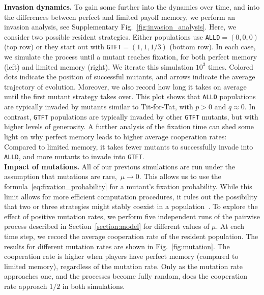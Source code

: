 \documentclass[11pt]{article}
\def\alld{\texttt{ALLD}}
\def\gtft{\texttt{GTFT}}
\theoremstyle{plainCl1}
\theoremstyle{plainCl2}
\begin{document}
\noindent
{\bf Invasion dynamics.} To gain some further into the dynamics over time, and into the differences between perfect and limited payoff memory, we perform an invasion analysis, see Supplementary Fig.~\ref{fig:invasion_analysis}. 
Here, we consider two possible resident strategies. 
Either populations use \alld$=(0,0,0)$ (top row) or they start out with \gtft$=(1,1,1/3)$ (bottom row). 
In each case, we simulate the process until a mutant reaches fixation, for both perfect memory (left) and limited memory (right). 
We iterate this simulation $10^{3}$ times. 
Colored dots indicate the position of successful mutants, and arrows indicate the average trajectory of evolution. 
Moreover, we also record how long it takes on average until the first mutant strategy takes over. 
This plot shows that \alld{} populations are typically invaded by mutants similar to Tit-for-Tat, with $p\!>\!0$ and $q\!\approx\!0$. 
In contrast, \gtft{} populations are typically invaded by other \gtft{} mutants, but with higher levels of generosity. 
A further analysis of the fixation time can shed some light on why perfect memory leads to higher average cooperation rates: 
Compared to limited memory, it takes fewer mutants to successfully invade into \alld{}, and more mutants to invade into \gtft{}.\\



\noindent
{\bf Impact of mutations.} 
All of our previous simulations are run under the assumption that mutations are rare,~$\mu\!\rightarrow\!0$. 
This allows us to use the formula~\eqref{eq:fixation_probability} for a mutant's fixation probability. 
While this limit allows for more efficient computation procedures, it rules out the possibility that two or three strategies might stably coexist in a population~\cite{tkadlec:pnas:2023}.
To explore the effect of positive mutation rates, we perform five independent runs of the pairwise process described in
Section~\ref{section:model} for different values of $\mu$.
At each time step, we record the average cooperation rate of the resident population. 
The results for different mutation rates are shown in Fig.~\ref{fig:mutation}. 
The cooperation rate is higher when players have perfect memory (compared to limited memory), regardless of the
mutation rate. 
Only as the mutation rate approaches one, and the processes become fully random, does the cooperation rate approach $1/2$ in both simulations.
\end{document}
